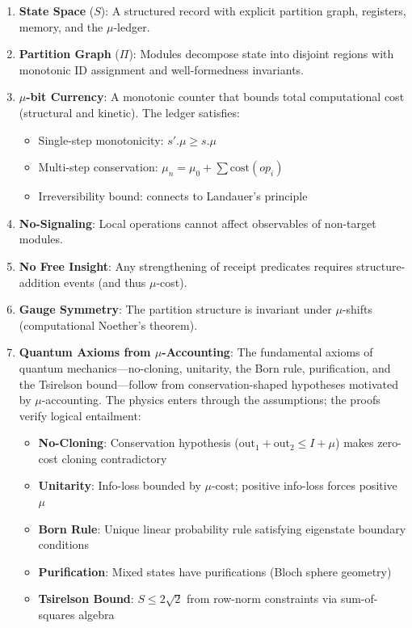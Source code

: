 \begin{enumerate}
    \item \textbf{State Space} ($S$): A structured record with explicit partition graph, registers, memory, and the $\mu$-ledger.
    
    \item \textbf{Partition Graph} ($\Pi$): Modules decompose state into disjoint regions with monotonic ID assignment and well-formedness invariants.
    
    \item \textbf{$\mu$-bit Currency}: A monotonic counter that bounds total computational cost (structural and kinetic). The ledger satisfies:
    \begin{itemize}
        \item Single-step monotonicity: $s'.\mu \ge s.\mu$
        \item Multi-step conservation: $\mu_n = \mu_0 + \sum \text{cost}(op_i)$
        \item Irreversibility bound: connects to Landauer's principle
    \end{itemize}
    
    \item \textbf{No-Signaling}: Local operations cannot affect observables of non-target modules.
    
    \item \textbf{No Free Insight}: Any strengthening of receipt predicates requires structure-addition events (and thus $\mu$-cost).
    
    \item \textbf{Gauge Symmetry}: The partition structure is invariant under $\mu$-shifts (computational Noether's theorem).
    
    \item \textbf{Quantum Axioms from $\mu$-Accounting}: The fundamental axioms of quantum mechanics---no-cloning, unitarity, the Born rule, purification, and the Tsirelson bound---follow from conservation-shaped hypotheses motivated by $\mu$-accounting. The physics enters through the assumptions; the proofs verify logical entailment:
    \begin{itemize}
        \item \textbf{No-Cloning}: Conservation hypothesis ($\text{out}_1 + \text{out}_2 \leq I + \mu$) makes zero-cost cloning contradictory
        \item \textbf{Unitarity}: Info-loss bounded by $\mu$-cost; positive info-loss forces positive $\mu$
        \item \textbf{Born Rule}: Unique linear probability rule satisfying eigenstate boundary conditions
        \item \textbf{Purification}: Mixed states have purifications (Bloch sphere geometry)
        \item \textbf{Tsirelson Bound}: $S \le 2\sqrt{2}$ from row-norm constraints via sum-of-squares algebra
    \end{itemize}
\end{enumerate}

